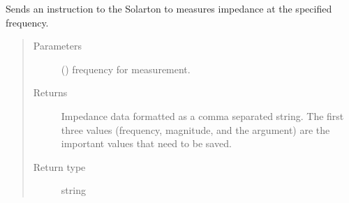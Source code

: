\documentclass[letterpaper,10pt,english]{sphinxmanual}
\begin{document}
\begin{fulllineitems}
%
\begin{sphinxVerbatim}[commandchars=\\\{\}]
   
  
    
\end{sphinxVerbatim}

\begin{fulllineitems}
\label{\detokenize{vtipy_docs/vtipy:vtipy.impedance.solartron1260.measure_frequency}}
Sends an instruction to the Solarton to measures impedance
at the specified frequency.
\begin{quote}\begin{description}
\item[{Parameters}] \leavevmode
{} () \textendash{} frequency for measurement.

\item[{Returns}] \leavevmode
{} \textendash{} Impedance data formatted as a comma separated
string. The first three values (frequency, magnitude, and the
argument) are the important values that need to be saved.

\item[{Return type}] \leavevmode
string

\end{description}\end{quote}

\end{fulllineitems}



\end{fulllineitems}
\end{document}
